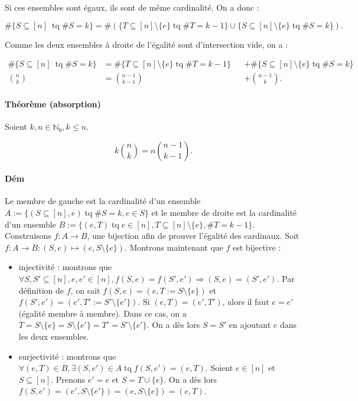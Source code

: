 \documentclass{article}
\DeclareMathOperator{\tq}{\text{ tq }}
\begin{document}
			Si ces ensembles sont égaux, ils sont de même cardinalité. On a donc :

			\[\#\{S \subseteq [n]\ \tq \#S = k\} = \#(\{T \subseteq [n] \setminus \{e\} \tq \#T = k-1\} \cup \{S \subseteq [n] \setminus \{e\} \tq \#S = k\}).\]

			Comme les deux ensembles à droite de l'égalité sont d'intersection vide, on a :

			\[\begin{aligned}
				\#\{S \subseteq [n]\ \tq \#S = k\} &= \#\{T \subseteq [n] \setminus \{e\} \tq \#T = k-1\} &&+ \#\{S \subseteq [n] \setminus \{e\} \tq \#S = k\} \\
				\binom nk						  &= \binom {n-1}{k-1}								   &&+ \binom {n-1}k.
			\end{aligned}\]

			\paragraph{Théorème (absorption)} Soient $k, n \in \mathbb N_0, k \leq n$.

			\[k\binom nk = n\binom {n-1}{k-1}.\]

			\paragraph{Dém} Le membre de gauche est la cardinalité d'un ensemble $A := \{(S \subseteq [n], e) \tq \#S = k, e \in S\}$ et le membre de droite est
			la cardinalité d'un ensemble $B := \{(e, T) \tq e \in [n], T \subseteq [n] \setminus \{e\}, \#T = k-1\}$. Construisons $f : A \to B$, une bijection afin de prouver
			l'égalité des cardinaux. Soit $f : A \to B : (S, e) \mapsto (e, S \setminus \{e\})$. Montrons maintenant que $f$ est bijective :

			\begin{itemize}
				\item injectivité : montrons que $\forall S, S' \subseteq [n], e, e' \in [n], f(S, e) = f(S', e') \Rightarrow (S, e) = (S', e')$.
				Par définition de $f$, on sait $f(S, e) = (e, T := S \setminus \{e\})$ et $f(S', e') = (e', T' := S' \setminus \{e'\})$. Si $(e, T) = (e', T')$,
				alors il faut $e = e'$ (égalité membre à membre). Dans ce cas, on a $T = S \setminus \{e\} = S \setminus \{e'\} = T' = S' \setminus \{e'\}$.
				On a dès lors $S = S'$ en ajoutant $e$ dans les deux ensembles.

				\item surjectivité : montrons que $\forall (e, T) \in B, \exists (S, e') \in A \tq f(S, e') = (e, T)$.
				Soient $e \in [n]$ et $S \subseteq [n]$. Prenons $e' = e$ et $S = T \cup \{e\}$. On a dès lors $f(S, e') = (e', S \setminus \{e'\})
				= (e, S \setminus \{e\}) = (e, T)$.
			\end{itemize}
\end{document}
